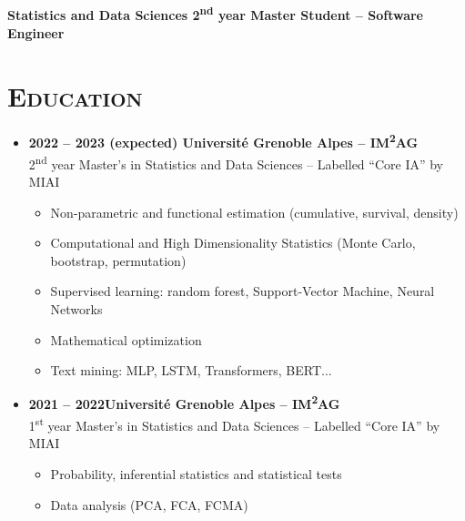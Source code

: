 \documentclass{article}
\begin{document}
\begin{minipage}{0.8\textwidth}
\begin{flushleft}
\begin{minipage}{1\textwidth}
\begin{minipage}{.5\textwidth}
\begin{flushright}
\begin{minipage}{.24\textwidth}
\begin{flushright}
            \end{flushright}
            \end{minipage}
        \end{flushright}
        \end{minipage}
    \end{minipage}
    \\[.3 cm]
    \textbf{Statistics and Data Sciences 2\textsuperscript{nd} year Master Student – Software Engineer}
    \\[.5 cm]
    \section*{\textsc{Education}}
    \begin{itemize}
        \item \textbf{2022 – 2023 (expected) \qquad Université Grenoble Alpes – IM\textsuperscript{2}AG} \\
        2\textsuperscript{nd} year Master’s in Statistics and Data Sciences – Labelled “Core IA” by MIAI
        \vspace{-.15cm}
        \begin{itemize}[leftmargin=*]
        \setlength\itemsep{.01cm}
            \item Non-parametric and functional estimation (cumulative, survival, density)
            \item Computational and High Dimensionality Statistics (Monte Carlo, bootstrap, permutation)
            \item Supervised learning: random forest, Support-Vector Machine, Neural Networks
            \item Mathematical optimization
            \item Text mining: MLP, LSTM, Transformers, BERT...
        \end{itemize}
        \item \textbf{2021 – 2022\qquad \qquad \qquad \qquad Université Grenoble Alpes – IM\textsuperscript{2}AG} \\
        1\textsuperscript{st} year Master’s in Statistics and Data Sciences – Labelled “Core IA” by MIAI
        \vspace{-.15cm}
        \begin{itemize}[leftmargin=*]
        \setlength\itemsep{.01cm}
            \item Probability, inferential statistics and statistical tests
            \item Data analysis (PCA, FCA, FCMA)

\end{itemize}
\end{itemize}
\end{flushleft}
\end{minipage}
\end{document}
